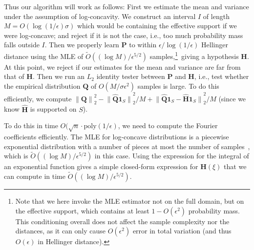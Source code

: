 \documentclass[11pt]{article}
\newcommand{\new}[1]{{\color{red} #1}}
\newcommand{\new}[1]{{#1}}
\theoremstyle{definition}
\newcommand{\poly}{\mathrm{poly}}
\newcommand{\p}{\mathbf{P}}
\newcommand{\q}{\mathbf{Q}}
\newcommand{\h}{\mathbf{H}}
\newcommand{\eps}{\epsilon}
\newcommand{\norm}[1]{\lVert#1\rVert}
\newcommand{\normtwo}[1]{{\norm{#1}}_2}
\newcommand{\tildeO}[1]{\tilde{O}\left( #1 \right)}
\providecommand{\poly}{\operatorname*{poly}}
\newcommand{\fourier}[1]{\widehat{#1}}
\begin{document}
Thus our algorithm will work as follows: First we estimate the mean and variance under the assumption of log-concavity. 
We construct an interval $I$ of length $M=O(\log(1/\eps) \sigma)$ which would be containing the effective support if we were log-concave; 
and reject if it is not the case, i.e., too much probability mass falls outside $I$. Then we properly learn $\p$ to within $\eps/\log(1/\eps)$ Hellinger distance 
using the MLE of \new{$\tildeO{(\log M)/\eps^{5/2}}$} samples,\footnote{Note that we here invoke the MLE estimator not on the full domain, but on the effective support, which contains at least $1-O(\eps^2)$ probability mass. This conditioning overall does not affect the sample complexity nor the distances, as it can only cause $O(\eps^2)$ error in total variation (and thus $O(\eps)$ in Hellinger distance).}\ giving a hypothesis $\h$. At this point, we reject if our estimates for the mean and variance 
are far from that of $\h$. Then we run an $L_2$ identity tester between $\p$ and $\h$, i.e., test whether the empirical distribution $\q$ of $O(M/\sigma\eps^2)$ samples is large. 
To do this efficiently, we compute $\normtwo{\q}^2-\normtwo{\fourier{\q}\mathbf{1}_S}^2/M + \normtwo{\fourier{\q}\mathbf{1}_S-\fourier{\h}\mathbf{1}_S}^2/M$ 
(since we know $\fourier{\h}$ is supported on $S$).

To do this in time $O(\sqrt{n} \cdot \poly(1/\eps)$, we need to compute the Fourier coefficients efficiently. The MLE for log-concave distributions 
is a piecewise exponential distribution with a number of pieces at most the number of samples~\cite{DR11}, 
which is \new{$\tildeO{(\log M)/\eps^{5/2}}$} in this case. Using the expression for the integral of an exponential function 
gives a simple closed-form expression for $\h(\xi)$ that we can compute in time \new{$\tildeO{(\log M)/\eps^{5/2}}$}.
\end{document}
